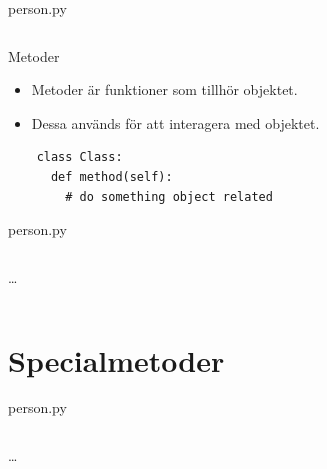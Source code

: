 \begin{frame}[fragile]
  person.py \hrulefill
  \inputminted[linenos,lastline=15]{python}{examples/person.py}
\end{frame}

\begin{frame}[fragile]
  \begin{block}{Metoder}
    \begin{itemize}
      \item Metoder är funktioner som tillhör objektet.
      \item Dessa används för att interagera med objektet.
    \end{itemize}
  \end{block}

  \begin{verbatim}
    class Class:
      def method(self):
        # do something object related
  \end{verbatim}
\end{frame}

\begin{frame}[fragile]
  person.py \hrulefill
  \inputminted[linenos,firstline=3,lastline=4]{python}{examples/person.py}
  \dots
  \inputminted[autogobble=false,linenos,firstline=16,lastline=23]{python}{examples/person.py}
\end{frame}


\section{Specialmetoder}

\begin{frame}[fragile]
  person.py \hrulefill
  \inputminted[linenos,firstline=3,lastline=4]{python}{examples/person.py}
  \dots
  \inputminted[autogobble=false,linenos,firstline=21,lastline=23]{python}{examples/person.py}
\end{frame}

